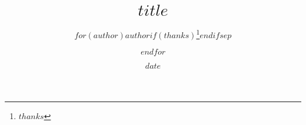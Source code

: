 \title{$title$}
\author{$for(author)$$author$$if(thanks)$\thanks{$thanks$}$endif$$sep$ \and $endfor$}
\date{$date$}